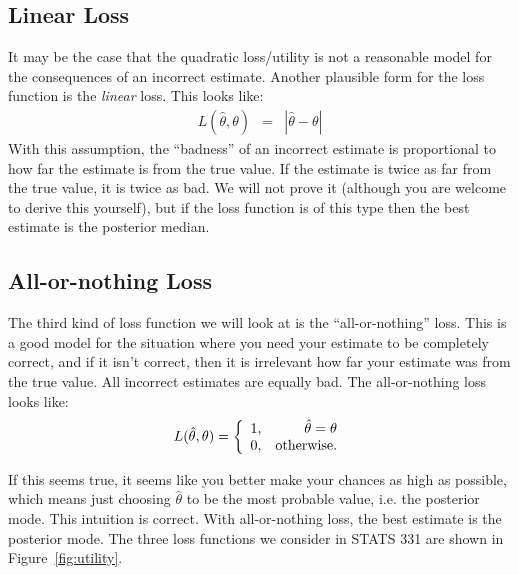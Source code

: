 \subsection{Linear Loss}
It may be the case that the quadratic loss/utility is not a reasonable model
for the consequences of an incorrect estimate. Another plausible form for the loss
function is the {\it linear} loss. This looks like:
\begin{eqnarray}
L(\hat{\theta}, \theta) &=& |\hat{\theta} - \theta|
\end{eqnarray}
With this assumption, the ``badness'' of an incorrect estimate is proportional
to how far the estimate is from the true value. If the estimate is twice as
far from the true value, it is twice as bad. We will not prove it (although you
are welcome to derive this yourself), but if the loss function is of this type
then the best estimate is the posterior median.

\subsection{All-or-nothing Loss}
The third kind of loss function we will look at is the ``all-or-nothing'' loss.
This is a good model for the situation where you need your estimate to be
completely correct, and if it isn't correct, then it is irrelevant how far your
estimate was from the true value. All incorrect estimates are equally bad.
The all-or-nothing loss looks like:
\begin{eqnarray}
L(\hat{\theta}, \theta) = \left\{
\begin{array}{lr}
1, & \hat{\theta} = \theta\\
0, & \textnormal{otherwise.}
\end{array}
\right.
\end{eqnarray}

If this seems true, it seems like you better make your chances as high as
possible, which means just choosing $\hat{\theta}$ to be the most probable value,
i.e. the posterior mode. This intuition is correct. With all-or-nothing loss,
the best estimate is the posterior mode. The three loss functions we consider
in STATS 331 are shown in Figure~\ref{fig:utility}.

